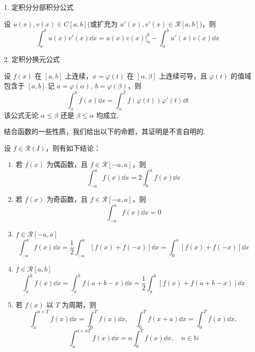 1. 定积分分部积分公式

设 $u(x), v(x) \in C[a,b]$(或扩充为 $u'(x), v'(x) \in \mathcal{R}[a,b]$)，则
\[
\int_a^b u(x) v'(x) \dd x = u(x)v(x) \bigg|_a^b - \int_a^b u'(x) v(x) \dd x
\] 

2. 定积分换元公式

设 $f(x)$ 在 $[a,b]$ 上连续，$x=\varphi(t)$ 在 $[\alpha,\beta]$ 上连续可导，且 $\varphi(t)$ 的值域包含于 $[a,b]$.记 $a = \varphi(\alpha),\ b = \varphi(\beta)$，则
\[
\int_a^b f(x) \dd x = \int_\alpha^\beta f\left( \varphi(t) \right) \varphi'(t) \dd t
\]
该公式无论 $\alpha \leq \beta$ 还是 $\beta \leq \alpha$ 均成立.

结合函数的一些性质，我们给出以下的命题，其证明是不言自明的.
\begin{proposition}
	设 \( f \in \mathcal{R}(I) \)，则有如下结论：
	\begin{enumerate}
		\item 若 \( f(x) \) 为偶函数，且 \( f \in \mathcal{R}[-a,a] \)，则
		\[
		\int_{-a}^a f(x)\dd x = 2\int_0^a f(x)\dd x
		\]
		\item 若 \( f(x) \) 为奇函数，且 \( f \in \mathcal{R}[-a,a] \)，则
		\[
		\int_{-a}^a f(x)\dd x = 0
		\]
		\item \( f \in \mathcal{R}[-a,a] \)
		\[
		\int_{-a}^a f(x) \dd x = \frac{1}{2}\int_{-a}^a \left[ f(x) + f(-x) \right] \dd x = \int_0^a \left[ f(x) + f(-x) \right] \dd x
		\]
		\item \( f \in \mathcal{R}[a,b] \)
		\[
		\int_a^b f(x) \dd x = \int_a^b f(a+b-x) \dd x = \frac{1}{2}\int_a^b \left[ f(x) + f(a+b-x) \right] \dd x
		\]
		\item 若 \( f(x) \) 以 \( T \) 为周期，则
		\[
		\int_a^{a+T} f(x) \dd x = \int_0^T f(x) \dd x, \quad \int_0^T f(x+a) \dd x = \int_0^T f(x) \dd x,
		\]
		\[
		\int_a^{a+nT} f(x) \dd x = n \int_0^T f(x) \dd x, \quad n \in \mathbb{N}
		\]
	\end{enumerate}
	
	
	
\end{proposition}

